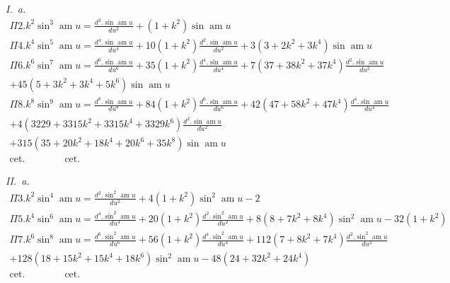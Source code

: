 \documentclass{article}
\begin{document}
\emph{I.\ a.}
\[
\begin{gathered}
\Pi 2.k^{2}\sin^{3}\operatorname{am}u=\frac{d^{2}.\sin\operatorname{am}u}{du^{2}}+(1+k^{2})\sin\operatorname{am}u\\[1.5ex]
\Pi 4.k^{4}\sin^{5}\operatorname{am}u=\frac{d^{4}.\sin\operatorname{am}u}{du^{4}}+10(1+k^{2})\frac{d^{2}.\sin\operatorname{am}u}{du^{2}}+3(3+2k^{2}+3k^{4})\sin\operatorname{am}u\\[1.5ex]
\Pi 6.k^{6}\sin^{7}\operatorname{am}u=\frac{d^{6}.\sin\operatorname{am}u}{du^{6}}+35(1+k^{2})\frac{d^{4}.\sin\operatorname{am}u}{du^{4}}+7(37+38k^{2}+37k^{4})\frac{d^{2}.\sin\operatorname{am}u}{du^{2}}\\[1.5ex]
+45(5+3k^{2}+3k^{4}+5k^{6})\sin\operatorname{am}u\\[1.5ex]
\Pi 8.k^{8}\sin^{9}\operatorname{am}u=\frac{d^{8}.\sin\operatorname{am}u}{du^{8}}+84(1+k^{2})\frac{d^{6}.\sin\operatorname{am}u}{du^{6}}+42(47+58k^{2}+47k^{4})\frac{d^{4}.\sin\operatorname{am}u}{du^{4}}\\[1.5ex]
+4(3229+3315k^{2}+3315k^{4}+3329k^{6})\frac{d^{2}.\sin\operatorname{am}u}{du^{2}}\\[1.5ex]
+315(35+20k^{2}+18k^{4}+20k^{6}+35k^{8})\sin\operatorname{am}u\\[1.5ex]
\text{cet.}\qquad\qquad\text{cet.}
\end{gathered}
\]

\emph{II.\ a.}
\[
\begin{gathered}
\Pi 3.k^{2}\sin^{4}\operatorname{am}u=\frac{d^{2}.\sin^{2}\operatorname{am}u}{du^{2}}+4(1+k^{2})\sin^{2}\operatorname{am}u-2\\[1.5ex]
\Pi 5.k^{4}\sin^{6}\operatorname{am}u=\frac{d^{4}.\sin^{2}\operatorname{am}u}{du^{4}}+20(1+k^{2})\frac{d^{2}.\sin^{2}\operatorname{am}u}{du^{2}}+8(8+7k^{2}+8k^{4})\sin^{2}\operatorname{am}u-32(1+k^{2})\\[1.5ex]
\Pi 7.k^{6}\sin^{8}\operatorname{am}u=\frac{d^{6}.\sin^{2}\operatorname{am}u}{du^{6}}+56(1+k^{2})\frac{d^{4}.\sin^{2}\operatorname{am}u}{du^{4}}+112(7+8k^{2}+7k^{4})\frac{d^{2}.\sin^{2}\operatorname{am}u}{du^{2}}\\[1.5ex]
+128(18+15k^{2}+15k^{4}+18k^{6})\sin^{2}\operatorname{am}u-48(24+32k^{2}+24k^{4})\\[1.5ex]
\text{cet.}\qquad\qquad\text{cet.}
\end{gathered}
\]
\end{document}
